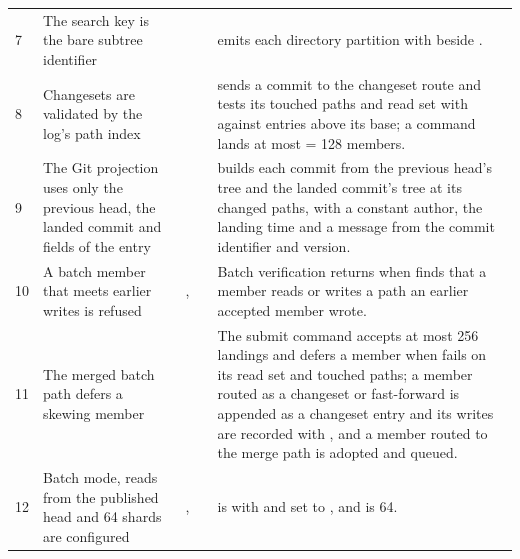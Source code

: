 \documentclass[11pt,letterpaper]{article}
\theoremstyle{definition}
\theoremstyle{remark}
\begin{document}
\begin{small}
\begin{longtable}{@{}L{0.7cm}L{3.2cm}L{4.0cm}L{1.3cm}L{4.8cm}@{}}
7 & The search key is the bare subtree identifier &  &  &  emits each directory partition with  beside . \\
8 & Changesets are validated by the log's path index &  &  &  sends a commit to the changeset route and tests its touched paths and read set with  against entries above its base; a command lands at most  = 128 members. \\
9 & The Git projection uses only the previous head, the landed commit and fields of the entry &  &  &  builds each commit from the previous head's tree and the landed commit's tree at its changed paths, with a constant author, the landing time and a message from the commit identifier and version. \\
10 & A batch member that meets earlier writes is refused & ,  &  & Batch verification returns  when  finds that a member reads or writes a path an earlier accepted member wrote. \\
11 & The merged batch path defers a skewing member &  &  & The submit command accepts at most 256 landings and defers a member when  fails on its read set and touched paths; a member routed as a changeset or fast-forward is appended as a changeset entry and its writes are recorded with , and a member routed to the merge path is adopted and queued. \\
12 & Batch mode, reads from the published head and 64 shards are configured & ,  &  &  is  with  and  set to , and  is 64. \\
\end{longtable}
\end{small}
\end{document}
